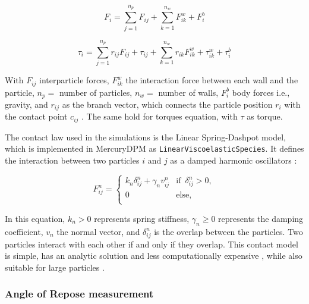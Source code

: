 \begin{equation} \label{eq:force}
    F_i = \sum_{j=1}^{n_p} F_{ij} + \sum_{k=1}^{n_w} F_{ik}^w  + F_i^b
\end{equation}

\begin{equation} \label{eq:torque}
    \tau_i = \sum_{j=1}^{n_p} r_{ij}F_{ij} + \tau_{ij} + \sum_{k=1}^{n_w} r_{ik}F_{ik}^w + \tau_{ik}^w +\tau_{i}^{b} 
\end{equation}

With $F_{ij}$ interparticle forces, $F_{ik}^w$ the interaction force between each wall and the particle, $n_p =$ number of particles, $n_w =$ number of walls, $F_i^b$ body forces i.e., gravity, and $r_{ij}$ as the branch vector, which connects the particle position $r_i$ with the contact point $c_{ij}$ . The same hold for torques equation, with $\tau$ as torque. 

The contact law used in the simulations is the Linear Spring-Dashpot model, which is implemented in MercuryDPM as \texttt{LinearViscoelasticSpecies}. It defines the interaction between two particles $i$ and $j$ as a damped harmonic oscillators \cite{LSD-info}:

\begin{equation}
    F_{ij}^n=\begin{cases}
        k_n \delta_{ij}^n + \gamma_n v_{ij}^n &\text{if } \, \delta_{ij}^n > 0, \\
        0 \quad &\text{else, } \,   \\
   \end{cases}
\end{equation}

In this equation, $k_n > 0$ represents spring stiffness, $\gamma_n \geq 0$ represents the damping coefficient, $v_n$ the normal vector, and $\delta_{ij}^n$ is the overlap between the particles. Two particles interact with each other if and only if they overlap. This contact model is simple, has an analytic solution and less computationally expensive \cite{NAVARRO2013}, while also suitable for large particles \cite{MercuryDPM}. 


\subsubsection{Angle of Repose measurement}

